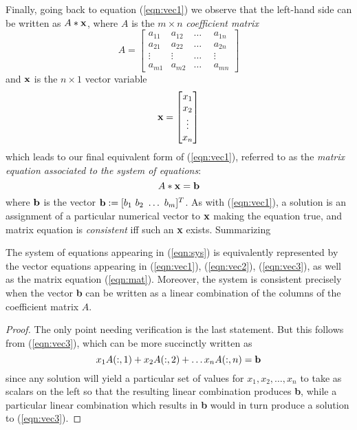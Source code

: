 \documentclass[handout]{ximera}
\begin{document}
Finally, going back to equation (\ref{eqn:vec1}) we observe that the left-hand side can be written as $A*{\bf x}$, where $A$ is the $m\times n$ {\it coefficient matrix}
\begin{equation}
\label{eqn:coeff}
A = \begin{bmatrix}
a_{11}  &a_{12} &{}\ldots{} &a_{1n}\\ 
a_{21} &a_{22} &{}\ldots{} & a_{2n}\\
\vdots\ \  &  \vdots\ \  &  {}\ldots{}\ \  &  \vdots\\
a_{m1} &a_{m2} &{}\ldots{} &a_{mn} 
\end{bmatrix}
\end{equation}
and ${\bf x}$ is the $n\times 1$ vector variable
\begin{equation}
\label{eqn:coeff}
{\bf x} = \begin{bmatrix}
x_1\\ 
x_2\\
\vdots\\
x_n 
\end{bmatrix}
\end{equation}
which leads to our final equivalent form of (\ref{eqn:vec1}), referred to as the {\it matrix equation associated to the system of equations}:
\begin{equation}\label{eqn:mat}
A*{\bf x} = {\bf b}
\end{equation}
where ${\bf b}$ is the vector ${\bf b} := [b_1\  b_2\ \dots\  b_m]^T$. As with (\ref{eqn:vec1}), a solution is an assignment of a particular numerical vector to $\bf x$ making the equation true, and matrix equation is {\it consistent} iff such an {\bf x} exists. Summarizing

\begin{theorem} The system of equations appearing in (\ref{eqn:sys}) is equivalently represented by the vector equations appearing in (\ref{eqn:vec1}), (\ref{eqn:vec2}), (\ref{eqn:vec3}), as well as the matrix equation (\ref{eqn:mat}). Moreover, the system is consistent precisely when the vector {\bf b} can be written as a linear combination of the columns of the coefficient matrix $A$. 
\end{theorem}

\begin{proof} The only point needing verification is the last statement. But this follows from (\ref{eqn:vec3}), which can be more succinctly written as
\[
x_1 A(:,1) + x_2 A(:,2) +\dots x_n A(:,n) = {\bf b}
\]
 since any solution will yield a particular set of values for $x_1,x_2,\dots,x_n$ to take as scalars on the left so that the resulting linear combination produces {\bf b}, while a particular linear combination which results in {\bf b} would in turn produce a solution to (\ref{eqn:vec3}).
\end{proof}
\end{document}
